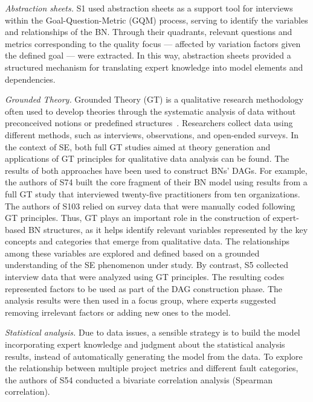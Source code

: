 \textit{Abstraction sheets.} S1 used abstraction sheets as a support tool for interviews within the Goal-Question-Metric (GQM) process, serving to identify the variables and relationships of the BN. Through their quadrants, relevant questions and metrics corresponding to the quality focus --- affected by variation factors given the defined goal --- were extracted. In this way, abstraction sheets provided a structured mechanism for translating expert knowledge into model elements and dependencies.

\textit{Grounded Theory.} Grounded Theory (GT) is a qualitative research methodology often used to develop theories through the systematic analysis of data without preconceived notions or predefined structures~\cite{urquhart2022grounded}. Researchers collect data using different methods, such as interviews, observations, and open-ended surveys. In the context of SE, both full GT studies aimed at theory generation and applications of GT principles for qualitative data analysis can be found. The results of both approaches have been used to construct BNs' DAGs. For example, the authors of S74 built the core fragment of their BN model using results from a full GT study that interviewed twenty-five practitioners from ten organizations. The authors of S103 relied on survey data that were manually coded following GT principles. Thus, GT plays an important role in the construction of expert-based BN structures, as it helps identify relevant variables represented by the key concepts and categories that emerge from qualitative data. The relationships among these variables are explored and defined based on a grounded understanding of the SE phenomenon under study. By contrast, S5 collected interview data that were analyzed using GT principles. The resulting codes represented factors to be used as part of the DAG construction phase. The analysis results were then used in a focus group, where experts suggested removing irrelevant factors or adding new ones to the model.

\textit{Statistical analysis.}  Due to data issues, a sensible strategy is to build the model incorporating expert knowledge and judgment about the statistical analysis results, instead of automatically generating the model from the data.  To explore the relationship between multiple project metrics and different fault categories, the authors of S54 conducted a bivariate correlation analysis (Spearman correlation). 

